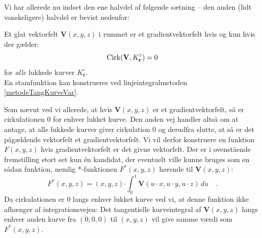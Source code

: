 Vi har allerede nu indset den ene halvdel af følgende sætning -- den anden (lidt vanskeligere) halvdel er bevist nedenfor:

\begin{theorem}[Cirkulationssætningen]\label{thmCirkulation}
Et glat vektorfelt $\mathbf{V}(x,y,z)$ i rummet er et gradientvektorfelt hvis og kun hvis der gælder:
\begin{equation}
\operatorname{Cirk}({\bf V}, K_{\bf r}^{\circ}) = 0
\end{equation}
for \emph{alle} lukkede kurver $K_{\mathbf{r}}^{\circ}$. \\

En stamfunktion kan konstrueres ved linjeintegralmetoden \ref{metodeTangKurveVar}.
\end{theorem}
\begin{bevis}
Som nævnt ved vi allerede, at hvis $\mathbf{V}(x,y,z)$ er et gradientvektorfelt, så er cirkulationen $0$ for enhver lukket kurve. Den anden vej handler altså om at antage, at alle lukkede kurver giver cirkulation $0$ og derudfra slutte, at så er det pågældende vektorfelt et gradientvektorfelt. Vi vil derfor konstruere en funktion $F(x,y,z)$ hvis gradientvektorfelt er det givne vektorfelt. Der er i ovenstående fremstilling stort set kun \'{e}n kandidat, der eventuelt ville kunne bruges som en sådan funktion, nemlig $*$-funktionen $F^{*}(x,y,z)$ hørende til $\mathbf{V}(x,y,z)$:
\begin{equation}
F^{*}(x,y,z) = (x,y,z)\bm{\cdot} \int_{0}^{1} \mathbf{V}(u\cdot x, u\cdot y, u\cdot z) \, du \quad.
\end{equation}
Da cirkulationen er $0$ langs enhver lukket kurve ved vi, at denne funktion ikke afhænger af integrationsvejen: Det tangentielle kurveintegral af $\mathbf{V}(x,y,z)$ langs enhver anden kurve fra $(0,0,0)$ til $(x,y,z)$ vil give samme værdi som $F^{*}(x,y,z)$. \\


\end{bevis}
